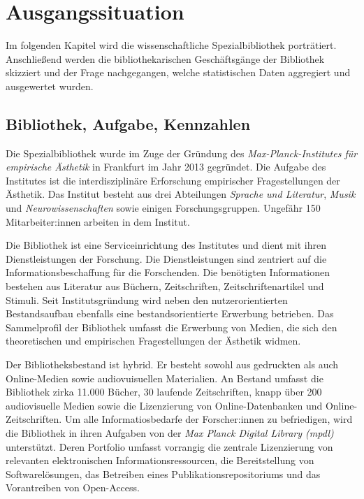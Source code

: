 \chapter{Ausgangssituation}

Im folgenden Kapitel wird die wissenschaftliche Spezialbibliothek porträtiert. Anschließend werden die bibliothekarischen Geschäftsgänge der
Bibliothek skizziert und der Frage nachgegangen, welche statistischen Daten aggregiert und ausgewertet wurden. 

\section{Bibliothek, Aufgabe, Kennzahlen}


Die Spezialbibliothek wurde im Zuge der Gründung des \textit{Max-Planck-Institutes für empirische Ästhetik} in Frankfurt im Jahr 2013 gegründet.
Die Aufgabe des Institutes ist die interdisziplinäre Erforschung empirischer Fragestellungen der Ästhetik. Das Institut besteht aus drei Abteilungen 
\textit{Sprache und Literatur}, \textit{Musik} und \textit{Neurowissenschaften} sowie einigen Forschungsgruppen. Ungefähr 150 Mitarbeiter:innen arbeiten 
in dem Institut. 

Die Bibliothek ist eine Serviceinrichtung des Institutes und dient mit ihren Dienstleistungen der Forschung.
Die Dienstleistungen sind zentriert auf die Informationsbeschaffung für die Forschenden. 
Die benötigten Informationen bestehen aus Literatur aus Büchern, Zeitschriften, Zeitschriftenartikel und Stimuli.
Seit Institutsgründung wird neben den nutzerorientierten Bestandsaufbau ebenfalls eine bestandsorientierte Erwerbung betrieben.
Das Sammelprofil der Bibliothek umfasst die Erwerbung von Medien, die sich den theoretischen und empirischen Fragestellungen der Ästhetik widmen.

Der Bibliotheksbestand ist hybrid. Er besteht sowohl aus gedruckten als auch Online-Medien sowie audiovuisuellen Materialien.
An Bestand umfasst die Bibliothek zirka 11.000 Bücher, 30 laufende Zeitschriften, knapp über 200 audiovisuelle Medien sowie die Lizenzierung von Online-Datenbanken
und Online-Zeitschriften.
Um alle Informatiosbedarfe der Forscher:innen zu befriedigen, wird die Bibliothek in ihren Aufgaben von der
\textit{Max Planck Digital Library ({mpdl})} unterstützt. Deren Portfolio umfasst vorrangig die zentrale Lizenzierung
von relevanten elektronischen Informationsressourcen, die Bereitstellung
von Softwarelösungen, das Betreiben eines Publikationsrepositoriums und
das Vorantreiben von Open-Access. 


